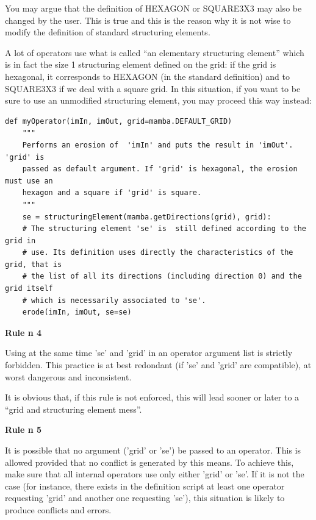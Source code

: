 \documentclass[a4paper,10pt,oneside]{article}
\begin{document}
You may argue that the definition of HEXAGON or SQUARE3X3 may also be changed by 
the user. This is true and this is the reason why it is not wise to modify the 
definition of standard structuring elements.

A lot of operators use what is called ``an elementary structuring element'' 
which is in fact the size 1 structuring element defined on the grid: if the grid 
is hexagonal, it corresponds to HEXAGON (in the standard definition) and to 
SQUARE3X3 if we deal with a square grid. In this situation, if you want to be 
sure to use an unmodified structuring element, you may proceed this way instead:

\lstset{language=Python}
\begin{lstlisting}
def myOperator(imIn, imOut, grid=mamba.DEFAULT_GRID)
    """
    Performs an erosion of  'imIn' and puts the result in 'imOut'. 'grid' is
    passed as default argument. If 'grid' is hexagonal, the erosion must use an 
    hexagon and a square if 'grid' is square.
    """
    se = structuringElement(mamba.getDirections(grid), grid):
    # The structuring element 'se' is  still defined according to the grid in 
    # use. Its definition uses directly the characteristics of the grid, that is
    # the list of all its directions (including direction 0) and the grid itself
    # which is necessarily associated to 'se'.
    erode(imIn, imOut, se=se)
\end{lstlisting}

\par
    
\textbf{Rule n\textdegree{} 4}
 
Using at the same time 'se' and 'grid' in an operator argument list is strictly 
forbidden. This practice is at best redondant (if 'se' and 'grid' are 
compatible), at worst dangerous and inconsistent.\par

It is obvious that, if this rule is not enforced, this will lead sooner or 
later to a ``grid and structuring element mess''. 

\par

\textbf{Rule n\textdegree{} 5}

It is possible that no argument ('grid' or 'se') be passed to an operator. This 
is allowed provided that no conflict is generated by this means. To achieve 
this, make sure that all internal operators use only either 'grid' or 'se'. If 
it is not the case (for instance, there exists in the definition script at 
least one operator requesting 'grid' and another one requesting 'se'), this 
situation is likely to produce conflicts and errors.
\end{document}

